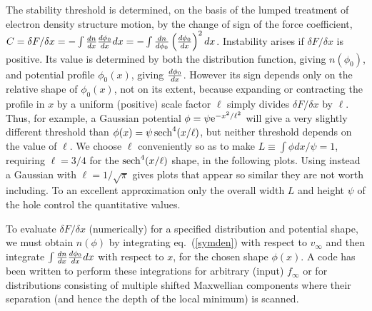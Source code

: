 \documentclass[12pt]{article}
\begin{document}
The stability threshold is determined, on the basis of the lumped
treatment of electron density structure motion, by the change of sign
of the force coefficient,
$C=\delta F/\delta x=-\int{dn\over dx}{d\phi_0\over dx} dx = -\int
{dn\over d\phi_0}\left(d\phi_0\over dx\right)^2 dx$. Instability
arises if $\delta F/\delta x$ is positive. Its value is determined by
both the distribution function, giving $n(\phi_0)$, and potential
profile $\phi_0(x)$, giving ${d\phi_0\over dx}$. However its sign
depends only on the relative shape of $\phi_0(x)$, not on its extent,
because expanding or contracting the profile in $x$ by a uniform
(positive) scale factor $\ell$ simply divides $\delta F/\delta x$ by
$\ell$.  Thus, for example, a Gaussian potential
$\phi=\psi {\rm e}^{-x^2/\ell^2}$ will give a very slightly different
threshold than $\phi(x)=\psi\, {\rm sech}^4(x/\ell)$, but neither
threshold depends on the value of $\ell$. We choose $\ell$ conveniently so
as to make $L\equiv\int \phi dx/\psi=1$, requiring $\ell=3/4$ for the
${\rm sech}^4(x/\ell)$ shape, in the following plots. Using instead a Gaussian
with $\ell=1/\sqrt{\pi}$ gives plots that appear so similar they are
not worth including. To an excellent approximation only the overall
width $L$ and height $\psi$ of the hole control the quantitative values.

To evaluate $\delta F/\delta x$ (numerically) for a specified distribution and
potential shape, we must obtain $n(\phi)$ by integrating eq.\
(\ref{symden}) with respect to $v_\infty$ and then integrate
$\int{dn\over dx}{d\phi_0\over dx} dx$ with respect to $x$, for the
chosen shape $\phi(x)$. A code has been written to perform these
integrations for arbitrary (input) $f_\infty$ or for distributions
consisting of multiple shifted Maxwellian components where
their separation (and hence the depth of the local minimum) is scanned. 
\end{document}

